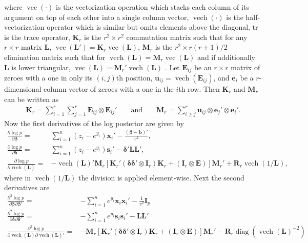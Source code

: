 \documentclass[12pt]{article}
\DeclareMathOperator{\vect}{vec}
\DeclareMathOperator{\vech}{vech}
\DeclareMathOperator{\diag}{diag}
\begin{document}
\begin{appendix}
where $\vect(\cdot)$ is the vectorization operation which stacks each column of its argument on top of each other into a single column vector, $\vech(\cdot)$ is the half-vectorization operator which is similar but omits elements above the diagonal, $\mathrm{tr}$ is the trace operator, $\bm{K}_r$ is the $r^2\times r^2$ commutation matrix such that for any $r\times r$ matrix $\bm{L}$, $\vect(\bm{L}') = \bm{K}_r\vect(\bm{L})$, $\bm{M}_r$ is the $r^2\times r(r+1)/2$ elimination matrix such that for $\vech(\bm{L}) = \bm{M}_r\vect(\bm{L})$ and if additionally $\bm{L}$ is lower triangular, $\vect(\bm{L}) = \bm{M}_r'\vech(\bm{L})$ \citep{magnus1980elimination,magnus1988linear}. Let $\bm{E}_{ij}$ be an $r\times r$ matrix of zeroes with a one in only its $(i,j)$th position, $\bm{u}_{ij} = \vech(\bm{E}_{ij})$, and $\bm{e}_i$ be a $r$-dimensional column vector of zeroes with a one in the $i$th row. Then $\bm{K}_r$ and $\bm{M}_r$ can be written as
\begin{align*}
\bm{K}_r = \sum_{i=1}^r\sum_{j=1}^r\bm{E}_{ij} \otimes \bm{E}_{ij}' && \mbox{ and } &&\bm{M}_r = \sum_{i\ge j}^r\bm{u}_{ij}\otimes \bm{e}_j'\otimes \bm{e}_i'.
\end{align*}
Now the first derivatives of the log posterior are given by
\begin{align*}
\frac{\partial \log p}{\partial \bm{\beta}} =& \sum_{i=1}^n(z_i - e^{y_i})\bm{x}_i' - \frac{(\bm{\beta} - \bm{b})'}{v^2},\\
\frac{\partial \log p}{\partial \bm{\delta}} =& \sum_{i=1}^n(z_i - e^{y_i})\bm{s}_i' - \bm{\delta}'\bm{L}\bm{L}',\\
\frac{\partial \log p}{\partial \vech(\bm{L})} =& -\vech(\bm{L})'\bm{M}_r\left[\bm{K}_r'(\bm{\delta}\bm{\delta}'\otimes \bm{I}_r)\bm{K}_r + (\bm{I}_r\otimes \bm{E})\right]\bm{M}_r' + \bm{R}_r\vech(1/\bm{L}),
\end{align*}
where in $\vech(1/\bm{L})$ the division is applied element-wise. Next the second derivatives are
\begin{align*}
\frac{\partial^2 \log p}{\partial \bm{\beta} \partial \bm{\beta}'} =& -\sum_{i=1}^ne^{y_i}\bm{x}_i\bm{x}_i' - \frac{1}{v^2}\bm{I}_p\\
\frac{\partial^2 \log p}{\partial \bm{\delta} \partial \bm{\delta}'} =&-\sum_{i=1}^ne^{y_i}\bm{s}_i\bm{s}_i' - \bm{L}\bm{L}'\\
\frac{\partial^2 \log p}{\partial \vech(\bm{L}) \partial \vech(\bm{L})'} =& -\bm{M}_r\left[\bm{K}_r'(\bm{\delta}\bm{\delta}'\otimes \bm{I}_r)\bm{K}_r + (\bm{I}_r\otimes \bm{E})\right]\bm{M}_r' - \bm{R}_r\diag\left(\vech(\bm{L})^{-2}\right)\\

\end{align*}
\end{appendix}
\end{document}
